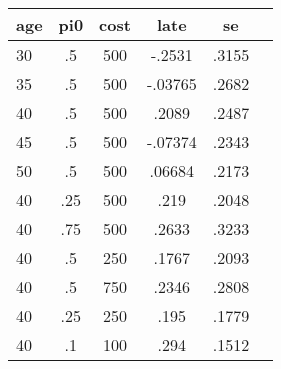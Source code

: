 \begin{table}[htbp]
\begin{tabular}{lccccc} \hline \hline
 \multicolumn{1}{c}{ age }  & pi0  & cost  & late  & se  \\  \hline 
       30 &        .5 &       500 &    -.2531 &     .3155 \\  
       35 &        .5 &       500 &   -.03765 &     .2682 \\  
       40 &        .5 &       500 &     .2089 &     .2487 \\  
       45 &        .5 &       500 &   -.07374 &     .2343 \\  
       50 &        .5 &       500 &    .06684 &     .2173 \\  
       40 &       .25 &       500 &      .219 &     .2048 \\  
       40 &       .75 &       500 &     .2633 &     .3233 \\  
       40 &        .5 &       250 &     .1767 &     .2093 \\  
       40 &        .5 &       750 &     .2346 &     .2808 \\  
       40 &       .25 &       250 &      .195 &     .1779 \\  
       40 &        .1 &       100 &      .294 &     .1512 \\  
\hline \hline \end{tabular}
\end{table}
